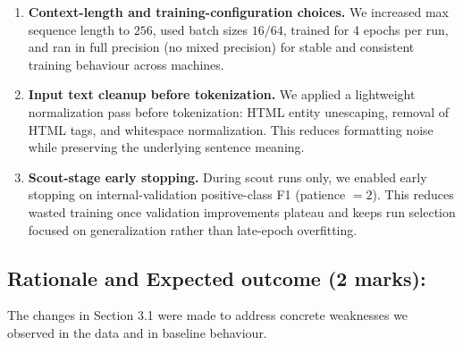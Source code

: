 \documentclass[11pt, a4paper]{article}
\begin{document}
\begin{enumerate}
  \item \textbf{Context-length and training-configuration choices.} We increased max sequence length to \(256\), used batch sizes \(16/64\), trained for 4 epochs per run, and ran in full precision (no mixed precision) for stable and consistent training behaviour across machines.
  \item \textbf{Input text cleanup before tokenization.} We applied a lightweight normalization pass before tokenization: HTML entity unescaping, removal of HTML tags, and whitespace normalization. This reduces formatting noise while preserving the underlying sentence meaning.
  \item \textbf{Scout-stage early stopping.} During scout runs only, we enabled early stopping on internal-validation positive-class F1 (patience \(=2\)). This reduces wasted training once validation improvements plateau and keeps run selection focused on generalization rather than late-epoch overfitting.
\end{enumerate}

\subsection{Rationale and Expected outcome (2 marks):}
The changes in Section 3.1 were made to address concrete weaknesses we observed in the data and in baseline behaviour.
\end{document}
